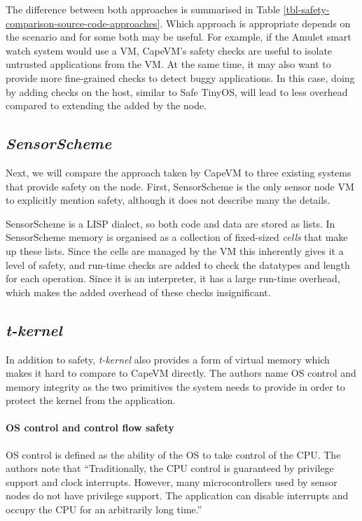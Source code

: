 The difference between both approaches is summarised in Table \ref{tbl-safety-comparison-source-code-approaches}. Which approach is appropriate depends on the scenario and for some both may be useful. For example, if the Amulet smart watch system would use a VM, CapeVM's safety checks are useful to isolate untrusted applications from the VM. At the same time, it may also want to provide more fine-grained checks to detect buggy applications. In this case, doing by adding checks on the host, similar to Safe TinyOS, will lead to less overhead compared to extending the added by the node.




\subsection{\emph{SensorScheme}}
Next, we will compare the approach taken by CapeVM to three existing systems that provide safety on the node. First, SensorScheme is the only sensor node VM to explicitly mention safety, although it does not describe many the details.

SensorScheme is a LISP dialect, so both code and data are stored as lists. In SensorScheme memory is organised as a collection of fixed-sized \emph{cells} that make up these lists. Since the cells are managed by the VM this inherently gives it a level of safety, and run-time checks are added to check the datatypes and length for each operation. Since it is an interpreter, it has a large run-time overhead, which makes the added overhead of these checks insignificant.




\subsection{\emph{t-kernel}}
In addition to safety, \emph{t-kernel} \cite{Gu:2005un, Gu:2006ww} also provides a form of virtual memory which makes it hard to compare to CapeVM directly. The authors name OS control and memory integrity as the two primitives the system needs to provide in order to protect the kernel from the application.

\paragraph{OS control and control flow safety}
OS control is defined as the ability of the OS to take control of the CPU. The authors note that “Traditionally, the CPU control is guaranteed by privilege support and clock interrupts. However, many microcontrollers used by sensor nodes do not have privilege support. The application can disable interrupts and occupy the CPU for an arbitrarily long time.”

